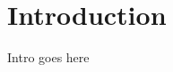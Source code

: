 \documentclass[showpacs,aps,floatfix,prb,reprint,superscriptaddress]{revtex4-1}
\begin{document}
\section{Introduction}
Intro goes here
%
\end{document}
